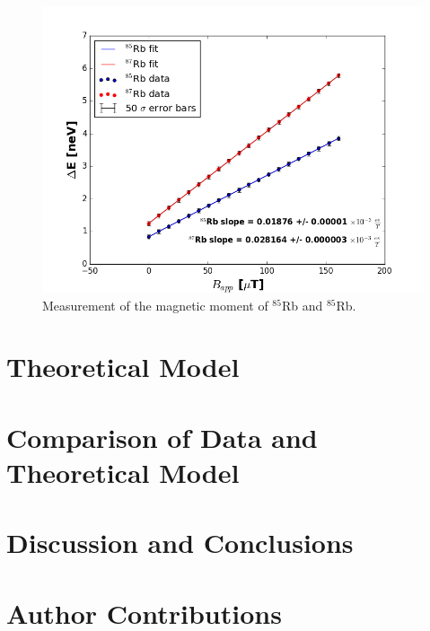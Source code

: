 \documentclass[aps,prl,twocolumn,groupedaddress]{revtex4-1}
\begin{document}
\begin{figure}
\includegraphics[width=\columnwidth]{magmom-verterr.png}
\caption{\label{MagMom} Measurement of the magnetic moment of $^{85}$Rb and $^{85}$Rb.}
\end{figure}

\section{Theoretical Model}
\section{Comparison of Data and Theoretical Model}
\section{Discussion and Conclusions}
\section{Author Contributions}


\end{document}
